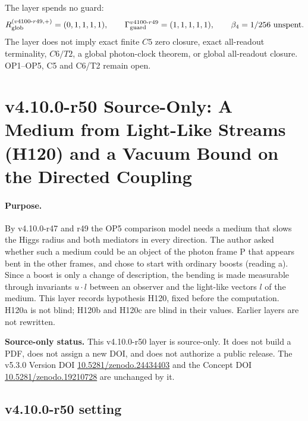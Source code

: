 The layer spends no guard:
\[
R_{\rm glob}^{(v4100\text{-}r49,+)}=(0,1,1,1,1),
\qquad
\Gamma_{\rm guard}^{v4100\text{-}r49}=(1,1,1,1,1),
\qquad
\beta_4=1/256\ \text{unspent}.
\]
The layer does not imply exact finite \(C5\) zero closure, exact all-readout terminality, \(C6/T2\), a global photon-clock theorem,
or global all-readout closure.  OP1--OP5, C5 and C6/T2 remain open.

\clearpage
\section*{v4.10.0-r50 Source-Only: A Medium from Light-Like Streams (H120) and a Vacuum Bound on the Directed Coupling}
\label{sec:v4100-r50-null-medium}

\paragraph{Purpose.}
By v4.10.0-r47 and r49 the OP5 comparison model needs a medium that slows the Higgs radius and both mediators in every direction.  The author
asked whether such a medium could be an object of the photon frame P that appears bent in the other frames, and chose to start with ordinary
boosts (reading a).  Since a boost is only a change of description, the bending is made measurable through invariants \(u\cdot l\) between an
observer and the light-like vectors \(l\) of the medium.  This layer records hypothesis H120, fixed before the computation.  H120a is not blind;
H120b and H120c are blind in their values.  Earlier layers are not rewritten.

\noindent\textbf{Source-only status.}
This v4.10.0-r50 layer is source-only.  It does not build a PDF, does not assign a new DOI,
and does not authorize a public release.  The v5.3.0 Version DOI
\href{https://doi.org/10.5281/zenodo.24434403}{10.5281/zenodo.24434403} and the Concept DOI
\href{https://doi.org/10.5281/zenodo.19210728}{10.5281/zenodo.19210728} are unchanged by it.

\subsection*{v4.10.0-r50 setting}
\label{subsec:v4100-r50-setting}


